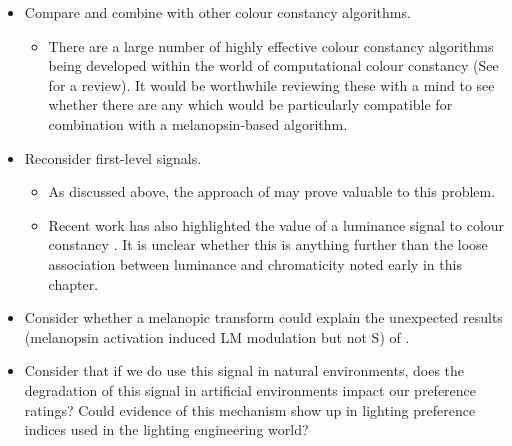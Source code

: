 \begin{itemize}
\begin{itemize}
\end{itemize}
\item Compare and combine with other colour constancy algorithms.
\begin{itemize}
    \item There are a large number of highly effective colour constancy algorithms being developed within the world of computational colour constancy (See \citet{gijsenij_computational_2011} for a review). It would be worthwhile reviewing these with a mind to see whether there are any which would be particularly compatible for combination with a melanopsin-based algorithm.
\end{itemize}
\item Reconsider first-level signals.
\begin{itemize}
    \item As discussed above, the approach of \citet{maloney_color_1986} may prove valuable to this problem.
    \item Recent work has also highlighted the value of a luminance signal to colour constancy \citep{chakrabarti_color_2015}. It is unclear whether this is anything further than the loose association between luminance and chromaticity noted early in this chapter.
\end{itemize}
\item Consider whether a melanopic transform could explain the unexpected results (melanopsin activation induced LM modulation but not S) of \citet{cao_evidence_2018}.
\item Consider that if we do use this signal in natural environments, does the degradation of this signal in artificial environments impact our preference ratings? Could evidence of this mechanism show up in lighting preference indices used in the lighting engineering world?
\end{itemize}






